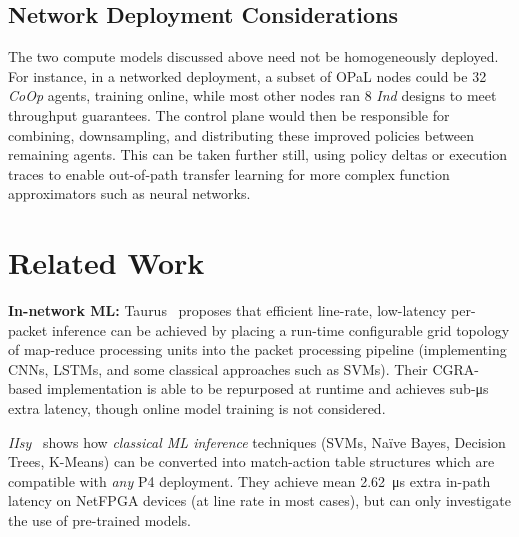 \documentclass[sigconf,natbib=false]{acmart}
\newcommand{\fakepara}[1]{\noindent\textbf{#1:}}
\newcommand{\approachshort}{OPaL}
\newcommand{\Coopfw}{\emph{CoOp}}
\newcommand{\coopfw}{\Coopfw}
\newcommand{\Indfw}{\emph{Ind}}
\newcommand{\indfw}{\Indfw}
\begin{document}

\subsection{Network Deployment Considerations}
The two compute models discussed above need not be homogeneously deployed.
For instance, in a networked deployment, a subset of \approachshort{} nodes could be \SI{32}{\bit} \coopfw{} agents, training online, while most other nodes ran \SI{8}{\bit} \indfw{} designs to meet throughput guarantees.
The control plane would then be responsible for combining, downsampling, and distributing these improved policies between remaining agents.
This can be taken further still, using policy deltas or execution traces to enable out-of-path transfer learning for more complex function approximators such as neural networks.

\section{Related Work}
\fakepara{In-network ML}
Taurus~\parencite{DBLP:journals/corr/abs-2002-08987} proposes that efficient line-rate, low-latency per-packet inference can be achieved by placing a run-time configurable grid topology of map-reduce processing units into the packet processing pipeline (implementing CNNs, LSTMs, and some classical approaches such as SVMs).
Their CGRA-based implementation is able to be repurposed at runtime and achieves sub-\si{\micro\second} extra latency, though online model training is not considered.

\emph{IIsy}~\parencite{DBLP:conf/hotnets/XiongZ19} shows how \emph{classical ML inference} techniques (SVMs, Na\"{i}ve Bayes, Decision Trees, K-Means) can be converted into match-action table structures which are compatible with \emph{any} P4 deployment.
They achieve mean \SI{2.62}{\micro\second} extra in-path latency on NetFPGA devices (at line rate in most cases), but can only investigate the use of pre-trained models.
\end{document}
